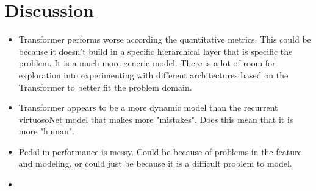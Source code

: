 \chapter{Discussion} \label{ch:ch6}
\begin{itemize}
    \item Transformer performs worse according the quantitative metrics. This could be because it doesn't build in a specific hierarchical layer that is specific the problem. It is a much more generic model. There is a lot of room for exploration into experimenting with different architectures based on the Transformer to better fit the problem domain. 
    \item Transformer appears to be a more dynamic model than the recurrent virtuosoNet model that makes more "mistakes". Does this mean that it is more "human". 
    \item Pedal in performance is messy. Could be because of problems in the feature and modeling, or could just be because it is a difficult problem to model. 
    \item {}
\end{itemize}